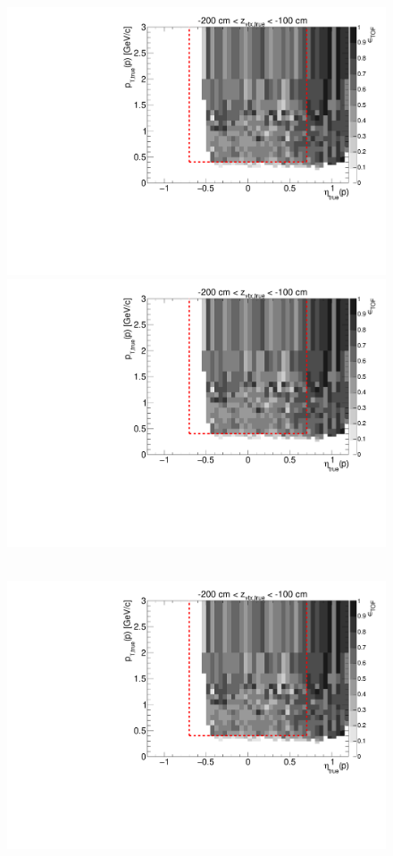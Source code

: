 \begin{figure}[hb]
{  \includegraphics[width=\linewidth,page=7]{graphics/eff/Eff2D_TOF_proton_Minus.pdf}\\
  \includegraphics[width=\linewidth,page=9]{graphics/eff/Eff2D_TOF_proton_Minus.pdf}
}~
\parbox{0.495\textwidth}{
  \centering
  \includegraphics[width=\linewidth,page=4]{graphics/eff/Eff2D_TOF_proton_Minus.pdf}\\
}
\end{figure}
